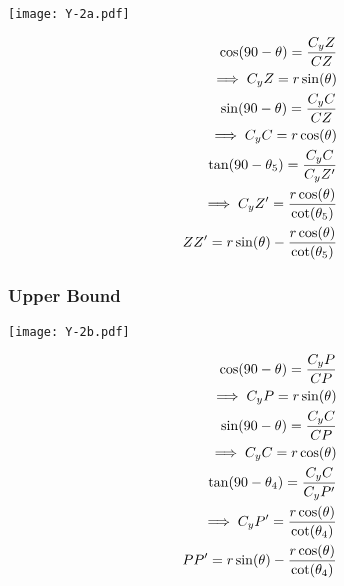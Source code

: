 \begin{minipage}[t]{0.5\textwidth}
\texttt{[image: Y-2a.pdf]}  
\end{minipage}
\begin{minipage}[t]{0.5\textwidth}
\vspace{-2in}
\begin{equation*}
\centering
\begin{aligned}
\cos(90-\theta)=\frac{C_{y}Z}{CZ}\\
\implies C_{y}Z=r\sin(\theta)\\
\sin(90-\theta) = \frac{C_{y}C}{CZ}\\
\implies C_{y}C = r\cos(\theta)\\
\tan(90-\theta_5) = \frac{C_{y}C}{C_{y}Z'}\\
\implies C_{y}Z' = \frac{r\cos(\theta)}{\cot(\theta_5)}\\
ZZ' =  r\sin(\theta) - \frac{r\cos(\theta)}{\cot(\theta_5)}
\end{aligned}
\end{equation*}
\end{minipage}





\subsubsection{Upper Bound}

\begin{minipage}[t]{0.5\textwidth}
\texttt{[image: Y-2b.pdf]}  
\end{minipage}
\begin{minipage}[t]{0.5\textwidth}
\vspace{-2in}
\begin{equation*}
\centering
\begin{aligned}
\cos(90-\theta)=\frac{C_{y}P}{CP}\\
\implies C_{y}P=r\sin(\theta)\\
\sin(90-\theta) = \frac{C_{y}C}{CP}\\
\implies C_{y}C = r\cos(\theta)\\
\tan(90-\theta_4) = \frac{C_{y}C}{C_{y}P'}\\
\implies C_{y}P' = \frac{r\cos(\theta)}{\cot(\theta_4)}\\
PP' =  r\sin(\theta) - \frac{r\cos(\theta)}{\cot(\theta_4)}
\end{aligned}
\end{equation*}
\end{minipage}







